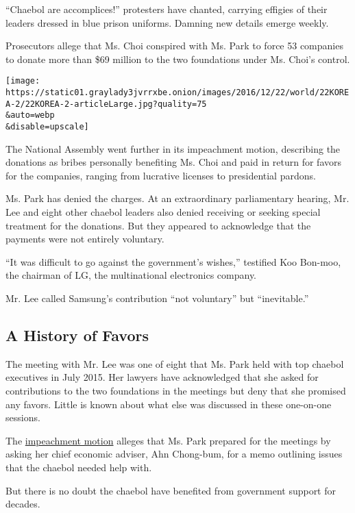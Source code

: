 ``Chaebol are accomplices!'' protesters have chanted, carrying effigies
of their leaders dressed in blue prison uniforms. Damning new details
emerge weekly.

Prosecutors allege that Ms. Choi conspired with Ms. Park to force 53
companies to donate more than \$69 million to the two foundations under
Ms. Choi's control.

\texttt{[image: https://static01.graylady3jvrrxbe.onion/images/2016/12/22/world/22KOREA-2/22KOREA-2-articleLarge.jpg?quality=75\\\&auto=webp\\\&disable=upscale]}

The National Assembly went further in its impeachment motion, describing
the donations as bribes personally benefiting Ms. Choi and paid in
return for favors for the companies, ranging from lucrative licenses to
presidential pardons.

Ms. Park has denied the charges. At an extraordinary parliamentary
hearing, Mr. Lee and eight other chaebol leaders also denied receiving
or seeking special treatment for the donations. But they appeared to
acknowledge that the payments were not entirely voluntary.

``It was difficult to go against the government's wishes,'' testified
Koo Bon-moo, the chairman of LG, the multinational electronics company.

Mr. Lee called Samsung's contribution ``not voluntary'' but
``inevitable.''

\hypertarget{a-history-of-favors}{%
\subsection{A History of Favors}\label{a-history-of-favors}}

The meeting with Mr. Lee was one of eight that Ms. Park held with top
chaebol executives in July 2015. Her lawyers have acknowledged that she
asked for contributions to the two foundations in the meetings but deny
that she promised any favors. Little is known about what else was
discussed in these one-on-one sessions.

The
\href{https://www.nytimes3xbfgragh.onion/2016/12/08/world/asia/south-korea-park-geun-hye-accusations-impeachment.html}{impeachment
motion} alleges that Ms. Park prepared for the meetings by asking her
chief economic adviser, Ahn Chong-bum, for a memo outlining issues that
the chaebol needed help with.

But there is no doubt the chaebol have benefited from government support
for decades.


